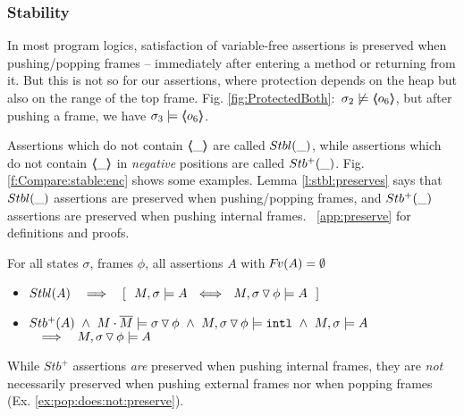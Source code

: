 \subsubsection{\textbf{Stability}} %
\label{s:preserve:call:ret}
In most program logics, satisfaction of  variable-free assertions  is preserved when pushing/popping frames
-- \ie immediately after entering a method or  returning from it.
But this is not  so for our assertions, where protection depends %
on the heap but also 
on the range of %
the top frame. \Eg  Fig. \ref{fig:ProtectedBoth}:\  
$\sigma_2 \not\models \langle\!\!\langle o_6 \rangle\!\!\rangle$, but after pushing a frame, we have $\sigma_3  \models \langle\!\!\langle o_6 \rangle\!\!\rangle$.
 
 

{Assertions} which do  not contain  $\langle\!\!\langle \_ \rangle\!\!\rangle$   are called ${Stbl( \_ )}$, 
while assertions which do  not contain $\langle\!\!\langle \_ \rangle\!\!\rangle$ in \emph{negative} positions are called ${Stb^+( \_ )}$. 
Fig. \ref{f:Compare:stable:enc} shows some examples.
Lemma \ref{l:stbl:preserves} says that ${Stbl( \_ )}$ assertions are  preserved when pushing/popping frames,
and ${Stb^+( \_ )}$ assertions are preserved when pushing  {internal} frames.
\Cf    \A\ \ref{app:preserve} for   definitions and proofs. 

\begin{lemma}
For all  states $\sigma$, frames $\phi$,   all assertions $A$ with  ${\hspace{-1pt}F\hspace{-1pt}}v(A)=\emptyset $
\label{l:preserve:asrt}
\label{l:stbl:preserves} 
\begin{itemize}
\item 
$\Stable{A} \  \ \  \Longrightarrow  \  \ \  [\ \ M, \sigma \models A \ \ \Longleftrightarrow \ \  M,{\PushSLong \phi \sigma} \models A\ \ ]$
\item 
\label{l:preserve:asrt:two}
${Stb^+( A )}   \ \wedge    \ {M\cdot\overline{M} \models {\ensuremath{ \sigma \, {\triangledown}\, \phi}}}\  \wedge\  M, { \sigma \, {\triangledown}\, \phi} \models  \mbox{\normalfont{\texttt{intl}}}\  \wedge  \ M, \sigma \models A $
$\  \ \ \Longrightarrow \ \  \ M,{ \sigma \, {\triangledown}\, \phi} \models A\ $
\end{itemize}
\end{lemma}


While $Stb^+$ assertions \emph{are} preserved  when pushing  internal frames,   they  are \emph{not} necessarily preserved when pushing  external frames  
nor when popping frames   (\cf Ex. \ref{ex:pop:does:not:preserve}). 

